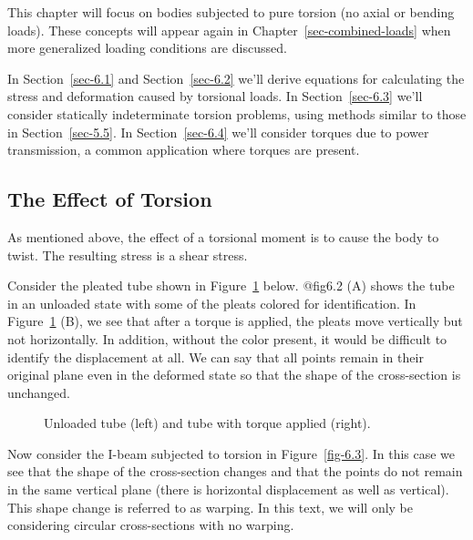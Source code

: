 \documentclass[
  letterpaper,
  DIV=11,
  numbers=noendperiod]{scrreprt}
\theoremstyle{definition}
\theoremstyle{remark}
\begin{document}
This chapter will focus on bodies subjected to pure torsion (no axial or
bending loads). These concepts will appear again in
Chapter~\ref{sec-combined-loads} when more generalized loading
conditions are discussed.

In Section~\ref{sec-6.1} and Section~\ref{sec-6.2} we'll derive
equations for calculating the stress and deformation caused by torsional
loads. In Section~\ref{sec-6.3} we'll consider statically indeterminate
torsion problems, using methods similar to those in
Section~\ref{sec-5.5}. In Section~\ref{sec-6.4} we'll consider torques
due to power transmission, a common application where torques are
present.

\subsection{The Effect of Torsion}\label{the-effect-of-torsion}

As mentioned above, the effect of a torsional moment is to cause the
body to twist. The resulting stress is a shear stress.

Consider the pleated tube shown in Figure~\ref{fig-6.2} below. @fig6.2
(A) shows the tube in an unloaded state with some of the pleats colored
for identification. In Figure~\ref{fig-6.2} (B), we see that after a
torque is applied, the pleats move vertically but not horizontally. In
addition, without the color present, it would be difficult to identify
the displacement at all. We can say that all points remain in their
original plane even in the deformed state so that the shape of the
cross-section is unchanged.

\begin{figure}


\caption{\label{fig-6.2}Unloaded tube (left) and tube with torque
applied (right).}

\end{figure}%

Now consider the I-beam subjected to torsion in Figure~\ref{fig-6.3}. In
this case we see that the shape of the cross-section changes and that
the points do not remain in the same vertical plane (there is horizontal
displacement as well as vertical). This shape change is referred to as
warping. In this text, we will only be considering circular
cross-sections with no warping.
\end{document}
